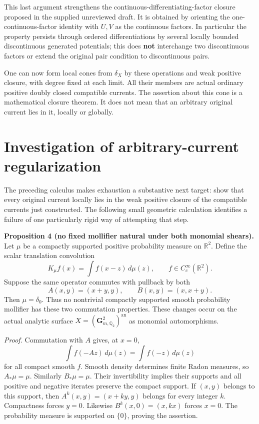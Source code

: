 \documentclass[
  11pt,
]{article}
\begin{document}
This last argument strengthens the continuous-differentiating-factor
closure proposed in the supplied unreviewed draft. It is obtained by
orienting the one-continuous-factor identity with \(U,V\) as the
continuous factors. In particular the property persists through ordered
differentiations by several locally bounded discontinuous generated
potentials; this does \textbf{not} interchange two discontinuous factors
or extend the original pair condition to discontinuous pairs.

One can now form local cones from \(\delta_X\) by these operations and
weak positive closure, with degree fixed at each limit. All their
members are actual ordinary positive doubly closed compatible currents.
The assertion about this cone is a mathematical closure theorem. It does
not mean that an arbitrary original current lies in it, locally or
globally.

\section{Investigation of arbitrary-current
regularization}\label{investigation-of-arbitrary-current-regularization}

The preceding calculus makes exhaustion a substantive next target: show
that every original current locally lies in the weak positive closure of
the compatible currents just constructed. The following small geometric
calculation identifies a failure of one particularly rigid way of
attempting that step.

\textbf{Proposition 4 (no fixed mollifier natural under both monomial
shears).} Let \(\mu\) be a compactly supported positive probability
measure on \(\mathbb R^2\). Define the scalar translation convolution
\[K_\mu f(x)=\int f(x-z)\,d\mu(z),\qquad f\in C_c^\infty(\mathbb R^2).\]
Suppose the same operator commutes with pullback by both
\[ A(x,y)=(x+y,y),\qquad B(x,y)=(x,x+y).\] Then \(\mu=\delta_0\). Thus
no nontrivial compactly supported smooth probability mollifier has these
two commutation properties. These changes occur on the actual analytic
surface \(X=(\mathbf G_{m,\mathbb Q_2}^2)^{\mathrm{an}}\) as monomial
automorphisms.

\emph{Proof.} Commutation with \(A\) gives, at \(x=0\),
\[\int f(-Az)\,d\mu(z)=\int f(-z)\,d\mu(z)\] for all compact smooth
\(f\). Smooth density determines finite Radon measures, so
\(A_*\mu=\mu\). Similarly \(B_*\mu=\mu\). Their invertibility implies
their supports and all positive and negative iterates preserve the
compact support. If \((x,y)\) belongs to this support, then
\(A^k(x,y)=(x+ky,y)\) belongs for every integer \(k\). Compactness
forces \(y=0\). Likewise \(B^k(x,0)=(x,kx)\) forces \(x=0\). The
probability measure is supported on \(\{0\}\), proving the assertion.
\end{document}
